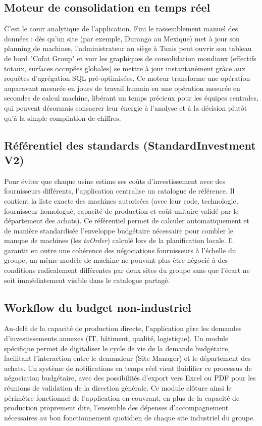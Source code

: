 \subsection{Moteur de consolidation en temps réel}
C'est le cœur analytique de l'application. Fini le rassemblement manuel des données : dès qu'un site (par exemple, Durango au Mexique) met à jour son planning de machines, l'administrateur au siège à Tunis peut ouvrir son tableau de bord "Cofat Group" et voir les graphiques de consolidation mondiaux (effectifs totaux, surfaces occupées globales) se mettre à jour instantanément grâce aux requêtes d'agrégation SQL pré-optimisées. Ce moteur transforme une opération auparavant mesurée en jours de travail humain en une opération mesurée en secondes de calcul machine, libérant un temps précieux pour les équipes centrales, qui peuvent désormais consacrer leur énergie à l'analyse et à la décision plutôt qu'à la simple compilation de chiffres.

\subsection{Référentiel des standards (StandardInvestment V2)}
Pour éviter que chaque usine estime ses coûts d'investissement avec des fournisseurs différents, l'application centralise un catalogue de référence. Il contient la liste exacte des machines autorisées (avec leur code, technologie, fournisseur homologué, capacité de production et coût unitaire validé par le département des achats). Ce référentiel permet de calculer automatiquement et de manière standardisée l'enveloppe budgétaire nécessaire pour combler le manque de machines (les \textit{toOrder}) calculé lors de la planification locale. Il garantit en outre une cohérence des négociations fournisseurs à l'échelle du groupe, un même modèle de machine ne pouvant plus être négocié à des conditions radicalement différentes par deux sites du groupe sans que l'écart ne soit immédiatement visible dans le catalogue partagé.

\subsection{Workflow du budget non-industriel}
Au-delà de la capacité de production directe, l'application gère les demandes d'investissements annexes (IT, bâtiment, qualité, logistique). Un module spécifique permet de digitaliser le cycle de vie de la demande budgétaire, facilitant l'interaction entre le demandeur (Site Manager) et le département des achats. Un système de notifications en temps réel vient fluidifier ce processus de négociation budgétaire, avec des possibilités d'export vers Excel ou PDF pour les réunions de validation de la direction générale. Ce module clôture ainsi le périmètre fonctionnel de l'application en couvrant, en plus de la capacité de production proprement dite, l'ensemble des dépenses d'accompagnement nécessaires au bon fonctionnement quotidien de chaque site industriel du groupe.

